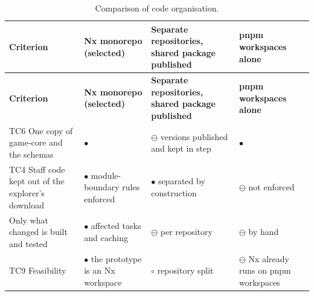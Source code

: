 {\small
\begin{longtable}{|>{\raggedright\arraybackslash}p{}|>{\raggedright\arraybackslash}p{}|>{\raggedright\arraybackslash}p{}|>{\raggedright\arraybackslash}p{}|}
\caption{Comparison of code organisation.} \\
\hline
\textbf{Criterion} & \textbf{Nx monorepo (selected)} & \textbf{Separate repositories, shared package published} & \textbf{pnpm workspaces alone} \\ \hline
\endfirsthead
\hline
\textbf{Criterion} & \textbf{Nx monorepo (selected)} & \textbf{Separate repositories, shared package published} & \textbf{pnpm workspaces alone} \\ \hline
\endhead
TC6 One copy of game-core and the schemas & $\bullet$ & $\ominus$ versions published and kept in step & $\bullet$ \\ \hline
TC4 Staff code kept out of the explorer's download & $\bullet$ module-\allowbreak{}boundary rules enforced\cite{r158} & $\bullet$ separated by construction & $\ominus$ not enforced \\ \hline
Only what changed is built and tested & $\bullet$ affected tasks and caching\cite{r158} & $\ominus$ per repository & $\ominus$ by hand \\ \hline
TC9 Feasibility & $\bullet$ the prototype is an Nx workspace & $\circ$ repository split & $\ominus$ Nx already runs on pnpm workspaces \\ \hline
\end{longtable}
}

